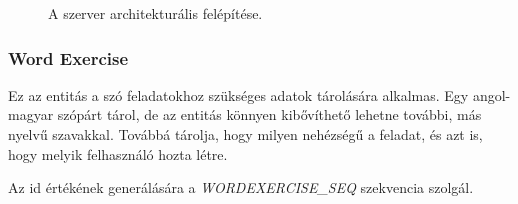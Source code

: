 \documentclass[11pt, a4paper]{article}
\begin{document}
    \begin{figure}[htbp]
    	\center
    	\caption{A szerver architekturális felépítése.}
    	\label{fig:er_diag}
    \end{figure}
    
    \subsubsection{Word Exercise}
    Ez az entitás a szó feladatokhoz szükséges adatok tárolására alkalmas. Egy angol-magyar szópárt tárol, de az entitás könnyen kibővíthető lehetne további, más nyelvű szavakkal. Továbbá tárolja, hogy milyen nehézségű a feladat, és azt is, hogy melyik felhasználó hozta létre.
    
    Az id értékének generálására a \textit{WORDEXERCISE\_SEQ} szekvencia szolgál.
    
\end{document}
